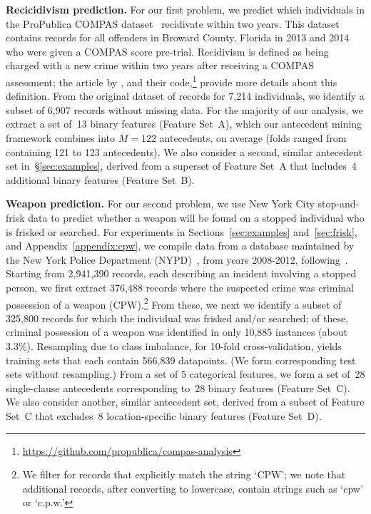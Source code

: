 \textbf{Recicidivism prediction.}
For our first problem, we predict which individuals in the ProPublica COMPAS
dataset~\citep{LarsonMaKiAn16} recidivate within two years.
%
This dataset contains records for all offenders in Broward County, Florida
in 2013 and 2014 who were given a COMPAS score pre-trial.
%
Recidivism is defined as being charged with a new crime within two years
after receiving a COMPAS assessment; the article by \citet{LarsonMaKiAn16},
and their code,\footnote{\url{https://github.com/propublica/compas-analysis}}
provide more details about this definition.
%
From the original dataset of records for 7,214 individuals,
we identify a subset of 6,907 records without missing data.
%
For the majority of our analysis, we extract a set of~13 binary features (Feature Set~A),
which our antecedent mining framework combines into ${M=122}$ antecedents,
on average (folds ranged from containing 121 to 123 antecedents).
%
We also consider a second, similar antecedent set in~\S\ref{sec:examples},
derived from a superset of Feature Set~A that includes~4 additional binary features (Feature Set~B).

\textbf{Weapon prediction.} For our second problem, we use New York City
stop-and-frisk data to predict whether a weapon will be found on a stopped
individual who is frisked or searched.
%
For experiments in Sections~\ref{sec:examples} and~\ref{sec:frisk}, and Appendix~\ref{appendix:cpw},
we compile data from a database maintained by the New York Police Department (NYPD)~\citep{nypd},
from years 2008-2012, following~\citet{Goel16}.
%
Starting from 2,941,390 records, each describing an incident involving
a stopped person, we first extract 376,488 records where the suspected
crime was criminal possession of a weapon (CPW).\footnote{We filter for records that
explicitly match the string `CPW'; we note that additional records, after converting to
lowercase, contain strings such as `cpw' or `c.p.w.'}
%
From these, we next we identify a subset of 325,800 records for which the
individual was frisked and/or searched; of these, criminal possession of a weapon
was identified in only 10,885 instances (about 3.3\%).
%
Resampling due to class imbalance, for 10-fold cross-validation, yields training sets
that each contain 566,839 datapoints. (We form corresponding test sets without resampling.)
%
From a set of 5 categorical features, we form a set of~28 single-clause antecedents
corresponding to~28 binary features (Feature Set~C).
%
We also consider another, similar antecedent set, derived from a subset of Feature Set~C
that excludes~8 location-specific binary features (Feature Set~D).

